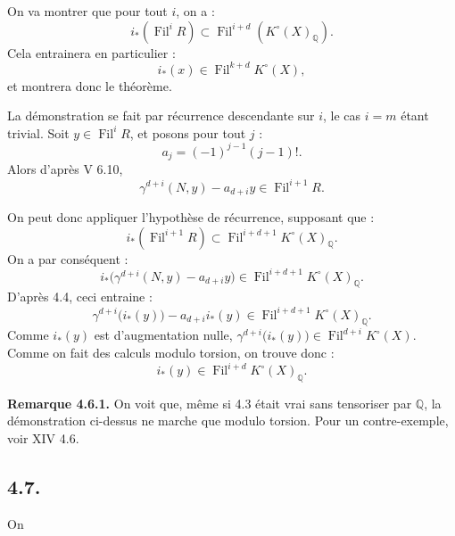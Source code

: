 \documentclass{article}
\newcommand{\Fil}{\operatorname{Fil}}
\begin{document}
On va
montrer que pour tout \(i\), on a :
\[
  i_*(\Fil^iR)\subset \Fil^{i+d}(K^\circ(X)_{\mathbb Q}).
\]
Cela entrainera en particulier :
\[
  i_*(x)\in\Fil^{k+d}K^\circ(X),
\]
et montrera donc le théorème.

La démonstration se fait par récurrence descendante sur \(i\), le cas \(i=m\) étant trivial. Soit \(y\in\Fil^iR\), et posons pour tout \(j\) :
\[
  a_j=(-1)^{j-1}(j-1)!.
\]
Alors d'après V 6.10,
\[
  \gamma^{d+i}(N,y)-a_{d+i}y\in\Fil^{i+1}R.
\]

On peut donc appliquer l'hypothèse de récurrence, supposant que :
\[
  i_*(\Fil^{i+1}R)\subset \Fil^{i+d+1}K^\circ(X)_{\mathbb Q}.
\]
On a par conséquent :
\[
  i_*\bigl(\gamma^{d+i}(N,y)-a_{d+i}y\bigr)
  \in\Fil^{i+d+1}K^\circ(X)_{\mathbb Q}.
\]
D'après 4.4, ceci entraine :
\[
  \gamma^{d+i}\bigl(i_*(y)\bigr)-a_{d+i}i_*(y)
  \in\Fil^{i+d+1}K^\circ(X)_{\mathbb Q}.
\]
Comme \(i_*(y)\) est d'augmentation nulle, \(\gamma^{d+i}\bigl(i_*(y)\bigr)\in\Fil^{d+i}K^\circ(X)\).
Comme on fait des calculs modulo torsion, on trouve donc :
\[
  i_*(y)\in\Fil^{i+d}K^\circ(X)_{\mathbb Q}.
\]

\textbf{Remarque 4.6.1.} On voit que, même si 4.3 était vrai sans tensoriser par \(\mathbb Q\), la démonstration ci-dessus ne marche que modulo torsion. Pour un contre-exemple, voir XIV 4.6.

\subsection*{4.7.}

On
\end{document}
